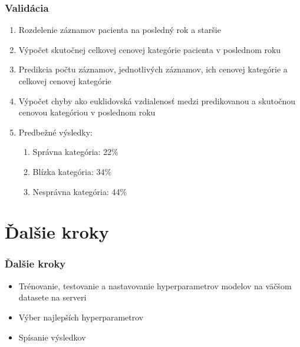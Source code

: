 \documentclass[slovak]{beamer}
\begin{document}
\begin{frame}
	\frametitle{Validácia}
	
		\begin{enumerate}
			\item<1> Rozdelenie záznamov pacienta na posledný rok a staršie 
			\item<1> Výpočet skutočnej celkovej cenovej kategórie pacienta v poslednom roku 
			\item<1> Predikcia počtu záznamov, jednotlivých záznamov, ich cenovej kategórie a celkovej cenovej kategórie
			\item<1> Výpočet chyby ako euklidovská vzdialenosť medzi predikovanou a skutočnou cenovou kategóriou v poslednom roku 
			\item<1> Predbežné výsledky:
			\begin{enumerate}
				\item<1> Správna kategória: 22\%
				\item<1> Blízka kategória: 34\%
				\item<1> Nesprávna kategória: 44\%
			\end{enumerate}
		\end{enumerate}
\end{frame}

\section{Ďalšie kroky}
 
\begin{frame}
	\frametitle{Ďalšie kroky}
	\begin{itemize}
		\item<1> Trénovanie, testovanie a nastavovanie hyperparametrov modelov na väčšom datasete na serveri 
		\item<1> Výber najlepších hyperparametrov
		\item<1> Spísanie výsledkov
	\end{itemize}
\end{frame}
\end{document}
